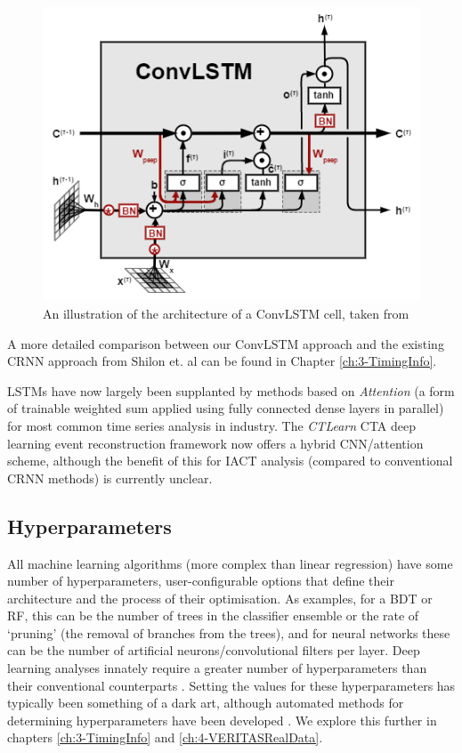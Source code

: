 \begin{figure}[ht] 
        \centering \includegraphics[width=0.5\columnwidth]{figures/convlstmcell.png}
        \caption{
                \label{fig:convlstmcell} %
                An illustration of the architecture of a ConvLSTM cell, taken from \cite{convlstmintro}
        }
\end{figure}
A more detailed comparison between our ConvLSTM approach and the existing CRNN approach from Shilon et. al \cite{Shilon} can be found in Chapter \ref{ch:3-TimingInfo}.

LSTMs have now largely been supplanted by methods based on \textit{Attention} (a form of trainable weighted sum applied using fully connected dense layers in parallel) for most common time series analysis in industry. The \textit{CTLearn} \cite{tjarkicrc} CTA deep learning event reconstruction framework now offers a hybrid CNN/attention scheme, although the benefit of this for IACT analysis (compared to conventional CRNN methods) is currently unclear.

\subsection{Hyperparameters}
All machine learning algorithms (more complex than linear regression) have some number of hyperparameters, user-configurable options that define their architecture and the process of their optimisation. As examples, for a BDT or RF, this can be the number of trees in the classifier ensemble or the rate of `pruning' (the removal of branches from the trees), and for neural networks these can be the number of artificial neurons/convolutional filters per layer. Deep learning analyses innately require a greater number of hyperparameters than their conventional counterparts \cite{hyperopt}. Setting the values for these hyperparameters has typically been something of a dark art, although automated methods for determining hyperparameters have been developed \cite{hyperopt}. We explore this further in chapters \ref{ch:3-TimingInfo} and \ref{ch:4-VERITASRealData}.

